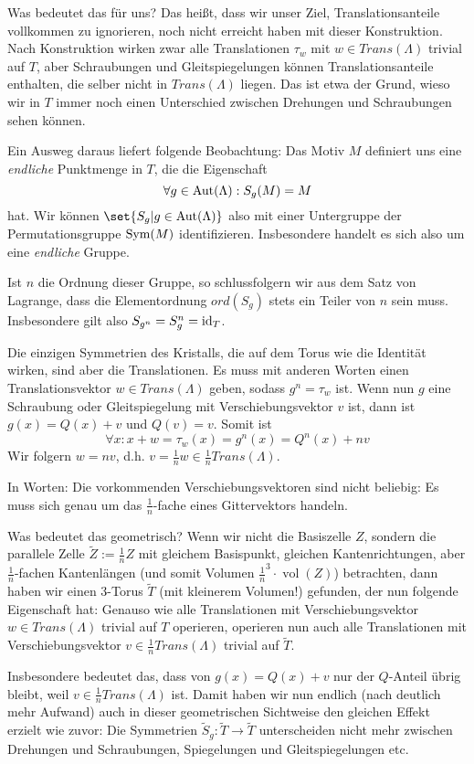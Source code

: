 \begin{remark}
\medbreak
Was bedeutet das für uns? Das heißt, dass wir unser Ziel, Translationsanteile vollkommen zu ignorieren, noch nicht erreicht haben mit dieser Konstruktion. Nach Konstruktion wirken zwar alle Translationen $\tau_w$ mit $w\in Trans(\Lambda)$ trivial auf $T$, aber Schraubungen und Gleitspiegelungen können Translationsanteile enthalten, die selber nicht in $Trans(\Lambda)$ liegen. Das ist etwa der Grund, wieso wir in $T$ immer noch einen Unterschied zwischen Drehungen und Schraubungen sehen können.

Ein Ausweg daraus liefert folgende Beobachtung: Das Motiv $M$ definiert uns eine \emph{endliche} Punktmenge in $T$, die die Eigenschaft
\[\forall g\in\operatorname{Aut}(\Lambda): S_g(M) = M\]
hat. Wir können $\set{S_g | g\in\Aut(\Lambda)}$ also mit einer Untergruppe der Permutationsgruppe $\operatorname{Sym}(M)$ identifizieren. Insbesondere handelt es sich also um eine \emph{endliche} Gruppe.

Ist $n$ die Ordnung dieser Gruppe, so schlussfolgern wir aus dem Satz von Lagrange, dass die Elementordnung $ord(S_g)$ stets ein Teiler von $n$ sein muss. Insbesondere gilt also $S_{g^n} = S_g^n = \operatorname{id}_T$.

Die einzigen Symmetrien des Kristalls, die auf dem Torus wie die Identität wirken, sind aber die Translationen. Es muss mit anderen Worten einen Translationsvektor $w\in Trans(\Lambda)$ geben, sodass $g^n = \tau_w$ ist. Wenn nun $g$ eine Schraubung oder Gleitspiegelung mit Verschiebungsvektor $v$ ist, dann ist $g(x)=Q(x)+v$ und $Q(v)=v$. Somit ist
\[\forall x: x+w=\tau_w(x)=g^n(x) = Q^n(x)+nv\]
Wir folgern $w=nv$, d.h. $v=\frac{1}{n}w\in \frac{1}{n}Trans(\Lambda)$.

In Worten: Die vorkommenden Verschiebungsvektoren sind nicht beliebig: Es muss sich genau um das $\frac{1}{n}$-fache eines Gittervektors handeln.

\medbreak
Was bedeutet das geometrisch? Wenn wir nicht die Basiszelle $Z$, sondern die parallele Zelle $\tilde{Z}:=\frac{1}{n}Z$ mit gleichem Basispunkt, gleichen Kantenrichtungen, aber $\frac{1}{n}$-fachen Kantenlängen (und somit Volumen $\frac{1}{n}^3\cdot\operatorname{vol}(Z)$) betrachten, dann haben wir einen 3-Torus $\tilde{T}$ (mit kleinerem Volumen!) gefunden, der nun folgende Eigenschaft hat: Genauso wie alle Translationen mit Verschiebungsvektor $w\in Trans(\Lambda)$ trivial auf $T$ operieren, operieren nun auch alle Translationen mit Verschiebungsvektor $v\in\frac{1}{n}Trans(\Lambda)$ trivial auf $\tilde{T}$.

Insbesondere bedeutet das, dass von $g(x)=Q(x)+v$ nur der $Q$-Anteil übrig bleibt, weil $v\in\frac{1}{n}Trans(\Lambda)$ ist. Damit haben wir nun endlich (nach deutlich mehr Aufwand) auch in dieser geometrischen Sichtweise den gleichen Effekt erzielt wie zuvor: Die Symmetrien $\tilde{S}_g: \tilde{T}\to\tilde{T}$ unterscheiden nicht mehr zwischen Drehungen und Schraubungen, Spiegelungen und Gleitspiegelungen etc.
\end{remark}

